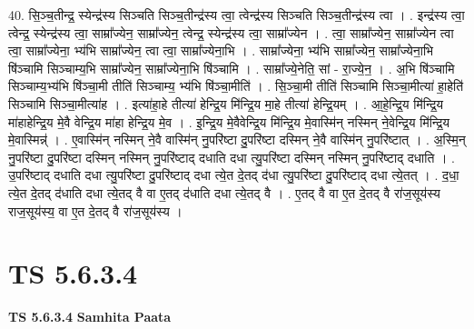 \documentclass[17pt]{extarticle}
\begin{document}
40. सि॒ञ्च॒तीन्द्र॒ स्येन्द्र॑स्य सिञ्चति सिञ्च॒तीन्द्र॑स्य त्वा॒ त्वेन्द्र॑स्य सिञ्चति सिञ्च॒तीन्द्र॑स्य त्वा । . इन्द्र॑स्य त्वा॒ त्वेन्द्र॒ स्येन्द्र॑स्य त्वा॒ साम्रा᳚ज्येन॒ साम्रा᳚ज्येन॒ त्वेन्द्र॒ स्येन्द्र॑स्य त्वा॒ साम्रा᳚ज्येन । . त्वा॒ साम्रा᳚ज्येन॒ साम्रा᳚ज्येन त्वा त्वा॒ साम्रा᳚ज्येना॒ भ्य॑भि साम्रा᳚ज्येन॒ त्वा त्वा॒ साम्रा᳚ज्येना॒भि । . साम्रा᳚ज्येना॒ भ्य॑भि साम्रा᳚ज्येन॒ साम्रा᳚ज्येना॒भि षि॑ञ्चामि सिञ्चाम्य॒भि साम्रा᳚ज्येन॒ साम्रा᳚ज्येना॒भि षि॑ञ्चामि । . साम्रा᳚ज्ये॒नेति॒ सां - रा॒ज्ये॒न॒ । . अ॒भि षि॑ञ्चामि सिञ्चाम्य॒भ्य॑भि षि॑ञ्चा॒मी तीति॑ सिञ्चाम्य॒ भ्य॑भि षि॑ञ्चा॒मीति॑ । . सि॒ञ्चा॒मी तीति॑ सिञ्चामि सिञ्चा॒मीत्या॑ हा॒हेति॑ सिञ्चामि सिञ्चा॒मीत्या॑ह । . इत्या॑हा॒हे तीत्या॑ हेन्द्रि॒य मि॑न्द्रि॒य मा॒हे तीत्या॑ हेन्द्रि॒यम् । . आ॒हे॒न्द्रि॒य मि॑न्द्रि॒य मा॑हाहेन्द्रि॒य मे॒वै वेन्द्रि॒य मा॑हा हेन्द्रि॒य मे॒व । . इ॒न्द्रि॒य मे॒वैवेन्द्रि॒य मि॑न्द्रि॒य मे॒वास्मि॑न् नस्मिन् ने॒वेन्द्रि॒य मि॑न्द्रि॒य मे॒वास्मिन्न्॑ । . ए॒वास्मि॑न् नस्मिन् ने॒वै वास्मि॑न् नु॒परि॑ष्टा दु॒परि॑ष्टा दस्मिन् ने॒वै वास्मि॑न् नु॒परि॑ष्टात् । . अ॒स्मि॒न् नु॒परि॑ष्टा दु॒परि॑ष्टा दस्मिन् नस्मिन् नु॒परि॑ष्टाद् दधाति दधा त्यु॒परि॑ष्टा दस्मिन् नस्मिन् नु॒परि॑ष्टाद् दधाति । . उ॒परि॑ष्टाद् दधाति दधा त्यु॒परि॑ष्टा दु॒परि॑ष्टाद् दधा त्ये॒त दे॒तद् द॑धा त्यु॒परि॑ष्टा दु॒परि॑ष्टाद् दधा त्ये॒तत् । . द॒धा॒ त्ये॒त दे॒तद् द॑धाति दधा त्ये॒तद् वै वा ए॒तद् द॑धाति दधा त्ये॒तद् वै । . ए॒तद् वै वा ए॒त दे॒तद् वै रा॑ज॒सूय॑स्य राज॒सूय॑स्य॒ वा ए॒त दे॒तद् वै रा॑ज॒सूय॑स्य । \newline
\pagebreak
{}

\section{ TS 5.6.3.4 }

\textbf{TS 5.6.3.4 } \newline
\textbf{Samhita Paata} \newline
\end{document}

